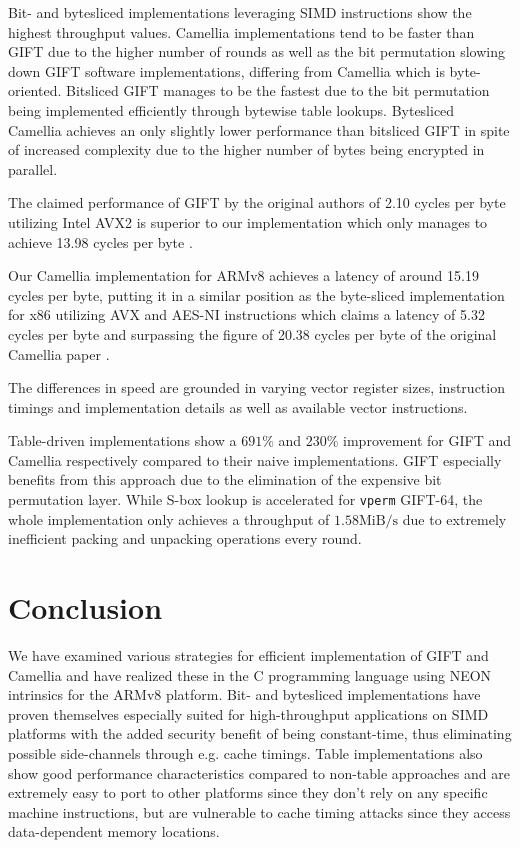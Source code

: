 Bit- and bytesliced implementations leveraging SIMD instructions show the
highest throughput values. Camellia implementations tend to be faster than GIFT
due to the higher number of rounds as well as the bit permutation slowing down
GIFT software implementations, differing from Camellia which is byte-oriented.
Bitsliced GIFT manages to be the fastest due to the bit permutation being
implemented efficiently through bytewise table lookups. Bytesliced Camellia
achieves an only slightly lower performance than bitsliced GIFT in spite of
increased complexity due to the higher number of bytes being encrypted in
parallel.

The claimed performance of GIFT by the original authors of 2.10 cycles per byte
utilizing Intel AVX2 is superior to our implementation which only manages to
achieve 13.98 cycles per byte \cite{gift:2017}.

Our Camellia implementation for ARMv8 achieves a latency of around 15.19 cycles
per byte, putting it in a similar position as the byte-sliced implementation
for x86 utilizing AVX and AES-NI instructions which claims a latency of 5.32
cycles per byte \cite{bcfastimplx86:2013} and surpassing the figure of 20.38
cycles per byte of the original Camellia paper \cite{camellia:2001}.

The differences in speed are grounded in varying vector register sizes,
instruction timings and implementation details as well as available vector
instructions.

Table-driven implementations show a $691\%$ and $230\%$ improvement for GIFT
and Camellia respectively compared to their naive implementations. GIFT
especially benefits from this approach due to the elimination of the expensive
bit permutation layer. While S-box lookup is accelerated for \texttt{vperm}
GIFT-64, the whole implementation only achieves a throughput of
$1.58\text{MiB/s}$ due to extremely inefficient packing and unpacking
operations every round.

\section{Conclusion}

We have examined various strategies for efficient implementation of GIFT and
Camellia and have realized these in the C programming language using NEON
intrinsics for the ARMv8 platform. Bit- and bytesliced implementations have
proven themselves especially suited for high-throughput applications on SIMD
platforms with the added security benefit of being constant-time, thus
eliminating possible side-channels through e.g. cache timings. Table
implementations also show good performance characteristics compared to
non-table approaches and are extremely easy to port to other platforms since
they don't rely on any specific machine instructions, but are vulnerable to
cache timing attacks since they access data-dependent memory locations.

